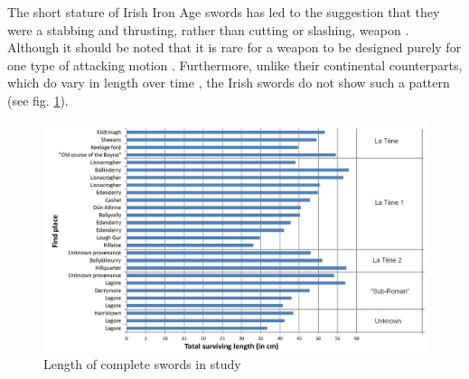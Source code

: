 The short stature of Irish Iron Age swords has led to the suggestion that they were a stabbing and thrusting, rather than cutting or slashing, weapon \parencites[121]{Raftery1989}[142]{Raftery1994}.
Although it should be noted that it is rare for a weapon to be designed purely for one type of attacking motion \parencite[168\psqq]{Clements2007}. 
Furthermore, unlike their continental counterparts, which do vary in length over time \parencites(for a detailed study c.f.)()[50\psqq]{Brunaux2004}[159--161]{Lejars2007}, 
the Irish swords do not show such a pattern (see fig. \ref{hughes_fig7}). 


\begin{figure}[!tb]%
\includegraphics[width=\linewidth]{figures/Hughes_Sword_fig07.jpg} 
\caption{Length of complete swords in study}
\label{hughes_fig7}
\end{figure}


